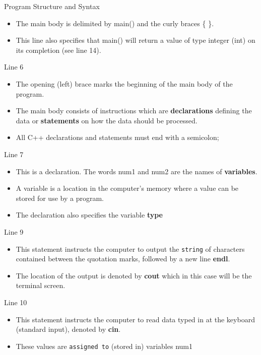 \documentclass[../lecture1-introduction.tex]{subfiles}
\begin{document}
\begin{frame}[fragile]{Program Structure and Syntax}
{\begin{itemize}
            \item The main body is delimited by main() and the curly braces \{ \}.
            \item This line also specifies that main() will return a value of type
            integer (int) on its completion (see line 14).
        \end{itemize}
    }
    {
        Line 6
        \begin{itemize}
            \item The opening (left) brace marks the beginning of the main body
            of the program.
            \item The main body consists of instructions which are \textbf{declarations}
            defining the data or \textbf{statements} on how the data should be
            processed.
            \item All C++ declarations and statements must end with a semicolon;
        \end{itemize}
    }
    {
        Line 7
        \begin{itemize}
            \item This is a declaration. The words num1 and num2 are the names
            of \textbf{variables}.
            \item A variable is a location in the computer's memory where a value
            can be stored for use by a program.
            \item The declaration also specifies the variable \textbf{type}
        \end{itemize}
    }
    {
        Line 9
        \begin{itemize}
            \item This statement instructs the computer to output the \texttt{string}
            of characters contained between the quotation marks, followed by a
            new line \textbf{endl}.
            \item The location of the output is denoted by \textbf{cout} which in this
            case will be the terminal screen.
        \end{itemize}
    }
    {
        Line 10
        \begin{itemize}
            \item This statement instructs the computer to read data typed in at
            the keyboard (standard input), denoted by \textbf{cin}.
            \item These values are \texttt{assigned to} (stored in) variables num1

\end{itemize}}
\end{frame}
\end{document}
